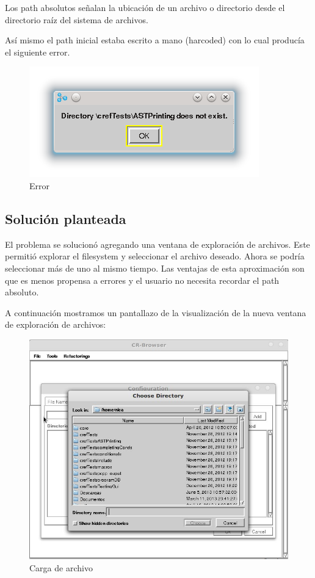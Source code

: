 \documentclass[a4paper,oneside,12pt]{article}
\begin{document}
Los path absolutos señalan la ubicación de un archivo o directorio desde el directorio raíz del sistema de archivos.

As\'i mismo el path inicial estaba escrito a mano (harcoded) con lo cual producía el siguiente error.

\begin{figure}[h!]
  \centering
    \includegraphics[scale=0.85]{images/codigo_original/error.png}
    \caption{Error }
\end{figure}

\subsection{Soluci\'on planteada}
El problema se solucion\'o agregando una ventana de exploraci\'on de archivos. Este permitió explorar el filesystem y seleccionar el archivo deseado. Ahora se podría seleccionar m\'as de uno al mismo tiempo.
Las ventajas de esta aproximaci\'on son que es menos propensa a errores y el usuario no necesita recordar el path absoluto.

A continuaci\'on mostramos un pantallazo de la visualizaci\'on de la nueva ventana de exploraci\'on de archivos:

\begin{figure}[h!]
  \centering
    \includegraphics[scale=0.50]{images/codigo_modificado/seleccionar_directorio.jpg}
     \caption{Carga de archivo}
\end{figure}
\end{document}

